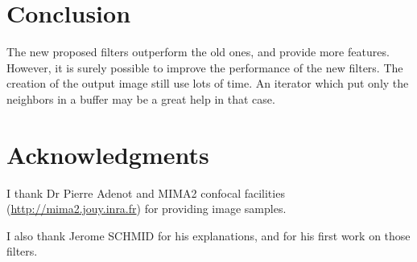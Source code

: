 \documentclass{InsightArticle}
\begin{document}
\section{Conclusion}
The new proposed filters outperform the old ones, and provide more features.
However, it is surely possible to improve the performance of the new filters.
The creation of the output image still use lots of time. An iterator which
put only the neighbors in a buffer may be a great help in that case.


\section{Acknowledgments}
I thank Dr Pierre Adenot and MIMA2 confocal facilities
(\url{http://mima2.jouy.inra.fr}) for providing image samples.

I also thank Jerome SCHMID for his explanations, and for his first work
on those filters.


\appendix





\nocite{ITKSoftwareGuide}
\end{document}
